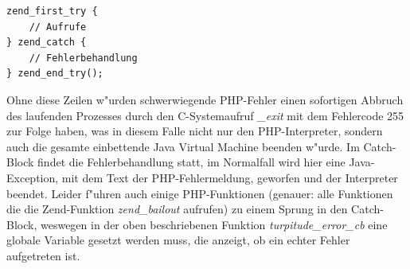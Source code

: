 \begin{lstlisting}[caption=Zend Try-Catch Block]
zend_first_try {
    // Aufrufe
} zend_catch {
    // Fehlerbehandlung
} zend_end_try();
\end{lstlisting}
Ohne diese Zeilen w"urden schwerwiegende PHP-Fehler einen sofortigen Abbruch des laufenden Prozesses durch den C-Systemaufruf
\emph{\_exit} mit dem Fehlercode 255 zur Folge haben, was in diesem Falle nicht nur den PHP-Interpreter, sondern auch die gesamte 
einbettende Java Virtual Machine beenden w"urde. Im Catch-Block findet die Fehlerbehandlung statt, im Normalfall wird hier eine
Java-Exception, mit dem Text der PHP-Fehlermeldung, geworfen und der Interpreter beendet. Leider f"uhren auch einige PHP-Funktionen
(genauer: alle Funktionen die die Zend-Funktion \emph{zend\_bailout} aufrufen)
zu einem Sprung in den Catch-Block, weswegen in der oben beschriebenen Funktion \emph{turpitude\_error\_cb} eine globale Variable
gesetzt werden muss, die anzeigt, ob ein echter Fehler aufgetreten ist.

